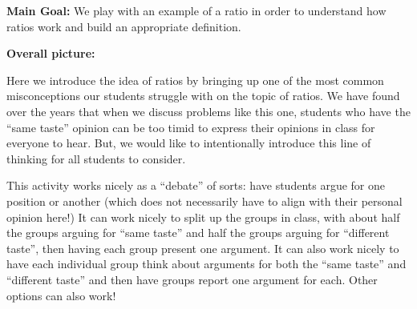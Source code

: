\documentclass{ximera}
\begin{document}
\newpage
\begin{instructorNotes}

{\bf Main Goal:} We play with an example of a ratio in order to understand how ratios work and build an appropriate definition.

{\bf Overall picture:}

Here we introduce the idea of ratios by bringing up one of the most common misconceptions our students struggle with on the topic of ratios.  We have found over the years that when we discuss problems like this one, students who have the ``same taste'' opinion can be too timid to express their opinions in class for everyone to hear.  But, we would like to intentionally introduce this line of thinking for all students to consider.

This activity works nicely as a ``debate'' of sorts: have students argue for one position or another (which does not necessarily have to align with their personal opinion here!) It can work nicely to split up the groups in class, with about half the groups arguing for ``same taste'' and half the groups arguing for ``different taste'', then having each group present one argument. It can also work nicely to have each individual group think about arguments for both the ``same taste'' and ``different taste'' and then have groups report one argument for each. Other options can also work!



\end{instructorNotes}
\end{document}
